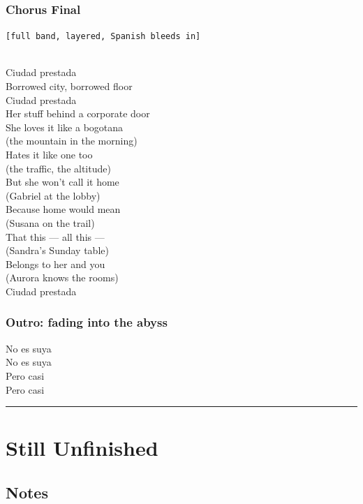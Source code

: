 \subsubsection{Chorus Final}\label{chorus-final}

\texttt{{[}full\ band,\ layered,\ Spanish\ bleeds\ in{]}}\strut \\
Ciudad prestada\\
Borrowed city, borrowed floor\\
Ciudad prestada\\
Her stuff behind a corporate door\\
She loves it like a bogotana\\
(the mountain in the morning)\\
Hates it like one too\\
(the traffic, the altitude)\\
But she won't call it home\\
(Gabriel at the lobby)\\
Because home would mean\\
(Susana on the trail)\\
That this --- all this ---\\
(Sandra's Sunday table)\\
Belongs to her and you\\
(Aurora knows the rooms)\\
Ciudad prestada

\subsubsection{Outro: fading into the
abyss}\label{outro-fading-into-the-abyss}

No es suya\\
No es suya\\
Pero casi\\
Pero casi

\begin{center}\rule{0.5\linewidth}{0.5pt}\end{center}

\section{Still Unfinished}\label{still-unfinished}

\subsection{Notes}\label{notes-38}

